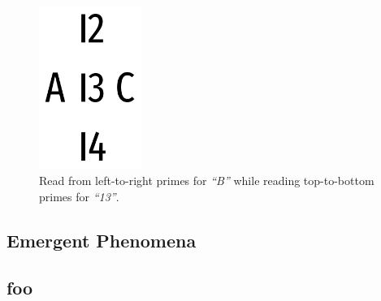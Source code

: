 

\begin{figure}[htbp]
	\begin{center}
		\includegraphics[width=0.3\textwidth]{inc/abc.png}
		\caption{Read from left-to-right primes for \textit{``B''} while reading top-to-bottom primes for \textit{``13''}.}
		\label{fig:abc}
	\end{center}
\end{figure}

 \cite{predictive_coding}

\subsection{Emergent Phenomena}


\subsection{foo}


